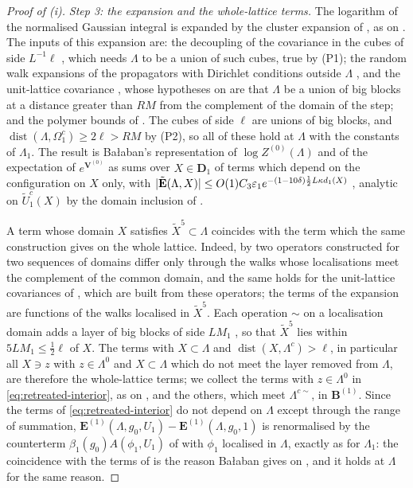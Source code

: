 \documentclass[11pt]{preprint}
\newcommand{\dist}{\operatorname{dist}}
\DeclarePairedDelimiter{\abs}{\lvert}{\rvert}
\numberwithin{equation}{section}
\theoremstyle{definition}
\theoremstyle{remark}
\theoremstyle{plain}
\begin{document}
\begin{proof}[Proof of (i)]
\emph{Step 3: the expansion and the whole-lattice terms.} The logarithm of the normalised Gaussian integral is expanded by the cluster expansion of \cite[Sections~1--2]{BalabanRG2}, as on \cite[p.~253]{BalabanCRE}. The inputs of this expansion are: the decoupling of the covariance in the cubes of side $L^{-1}\ell$ \cite[(1.3)--(1.4), p.~2]{BalabanRG2}, which needs $\Lambda$ to be a union of such cubes, true by (P1); the random walk expansions of the propagators with Dirichlet conditions outside $\Lambda$ \cite[Theorems~3.7, 3.9, 3.10, Corollary~3.8, pp.~409--416]{BalabanPBG}, and the unit-lattice covariance \cite[Theorem~3.15, p.~432]{BalabanPBG}, whose hypotheses on \cite[p.~427]{BalabanPBG} are that $\Lambda$ be a union of big blocks at a distance greater than $RM$ from the complement of the domain of the step; and the polymer bounds of \cite[(2.38), p.~20]{BalabanRG2}. The cubes of side $\ell$ are unions of big blocks, and $\dist(\Lambda, \Omega_1^c) \geq 2\ell > RM$ by (P2), so all of these hold at $\Lambda$ with the constants of $\Lambda_1$. The result is Ba{\l}aban's representation of $\log Z^{(0)}(\Lambda)$ and of the expectation of $e^{\mathbf V^{(0)}}$ as sums over $X \in \mathbf D_1$ of terms which depend on the configuration on $X$ only, with $\abs{\tilde{\mathbf E}(\Lambda, X)} \leq O(1)C_3\varepsilon_1e^{-(1 - 10\delta)\frac12L\kappa d_1(X)}$ \cite[(2.41), p.~21]{BalabanRG2}, analytic on $\tilde U^c_1(X)$ by the domain inclusion of \cite[pp.~262--263]{BalabanRG1}.

A term whose domain $X$ satisfies $\tilde X^5 \subset \Lambda$ coincides with the term which the same construction gives on the whole lattice. Indeed, by \cite[Theorem~3.14, p.~427]{BalabanPBG} two operators constructed for two sequences of domains differ only through the walks whose localisations meet the complement of the common domain, and the same holds for the unit-lattice covariances of \cite[Section~E]{BalabanPBG}, which are built from these operators; the terms of the expansion are functions of the walks localised in $\tilde X^5$. Each operation $\sim$ on a localisation domain adds a layer of big blocks of side $LM_1$ \cite[p.~408]{BalabanPBG}, so that $\tilde X^5$ lies within $5LM_1 \leq \frac12\ell$ of $X$. The terms with $X \subset \Lambda$ and $\dist(X, \Lambda^c) > \ell$, in particular all $X \ni z$ with $z \in \Lambda^0$ and $X \subset \Lambda$ which do not meet the layer removed from $\Lambda$, are therefore the whole-lattice terms; we collect the terms with $z \in \Lambda^0$ in \eqref{eq:retreated-interior}, as on \cite[p.~259]{BalabanCRE}, and the others, which meet $\Lambda^{c\sim}$, in $\mathbf B^{(1)}$. Since the terms of \eqref{eq:retreated-interior} do not depend on $\Lambda$ except through the range of summation, $\mathbf E^{(1)}(\Lambda, g_0, U_1) - \mathbf E^{(1)}(\Lambda, g_0, 1)$ is renormalised by the counterterm $\beta_1(g_0)A(\phi_1, U_1)$ of \cite[p.~253]{BalabanCRE} with $\phi_1$ localised in $\Lambda$, exactly as for $\Lambda_1$: the coincidence with the terms of \cite{BalabanRG1} is the reason Ba{\l}aban gives on \cite[p.~254]{BalabanCRE}, and it holds at $\Lambda$ for the same reason.


\end{proof}
\end{document}

